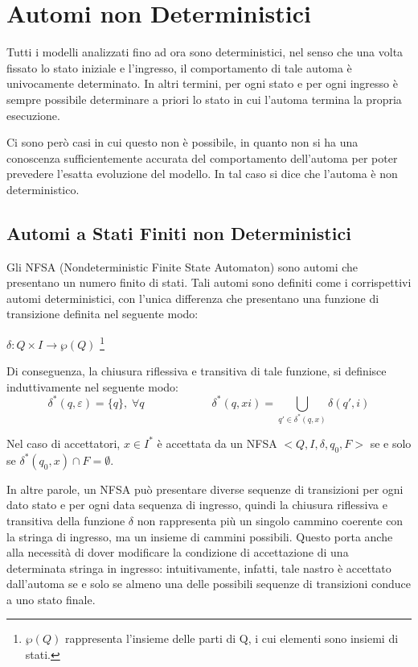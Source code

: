 \chapter{Automi non Deterministici}
  Tutti i modelli analizzati fino ad ora sono deterministici, nel senso che una volta fissato lo stato iniziale e l'ingresso, il comportamento di tale automa è univocamente determinato. In altri termini, per ogni stato e per ogni ingresso è sempre possibile determinare a priori lo stato in cui l'automa termina la propria esecuzione.
  
  Ci sono però casi in cui questo non è possibile, in quanto non si ha una conoscenza sufficientemente accurata del comportamento dell'automa per poter prevedere l'esatta evoluzione del modello. In tal caso si dice che l'automa è non deterministico. 

  \section{Automi a Stati Finiti non Deterministici}
  Gli NFSA (Nondeterministic Finite State Automaton) sono automi che presentano un numero finito di stati. Tali automi sono definiti come i corrispettivi automi deterministici, con l'unica differenza che presentano una funzione di transizione definita nel seguente modo:
  
  \(\delta:Q\times I\to \wp(Q)\) \footnote{\(\wp (Q)\) rappresenta l'insieme delle parti di Q, i cui elementi sono insiemi di stati.}

  Di conseguenza, la chiusura riflessiva e transitiva di tale funzione, si definisce induttivamente nel seguente modo:
  \begin{equation*}
    \delta^*(q,\varepsilon)=\{q\},\; \forall q \qquad\qquad\qquad \delta^*(q,xi)=\bigcup_{q'\in \delta^*(q,x)}\delta(q',i)
  \end{equation*}

  Nel caso di accettatori, \(x\in I^*\) è accettata da un NFSA \(<Q,I,\delta, q_0, F>\) se e solo se \(\delta^*(q_0,x)\cap F = \emptyset\).

  In altre parole, un NFSA può presentare diverse sequenze di transizioni per ogni dato stato e per ogni data sequenza di ingresso, quindi la chiusura riflessiva e transitiva della funzione \(\delta\) non rappresenta più un singolo cammino coerente con la stringa di ingresso, ma un insieme di cammini possibili. Questo porta anche alla necessità di dover modificare la condizione di accettazione di una determinata stringa in ingresso: intuitivamente, infatti, tale nastro è accettato dall'automa se e solo se almeno una delle possibili sequenze di transizioni conduce a uno stato finale. 

